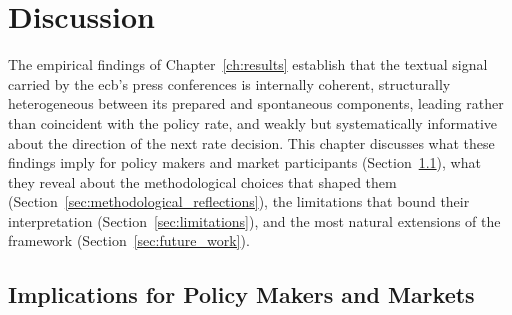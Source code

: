 %
%

\chapter{Discussion}\label{ch:discussion}

The empirical findings of Chapter~\ref{ch:results} establish that the textual signal carried by the \gls{ecb}'s press conferences is internally coherent, structurally heterogeneous between its prepared and spontaneous components, leading rather than coincident with the policy rate, and weakly but systematically informative about the direction of the next rate decision. This chapter discusses what these findings imply for policy makers and market participants (Section~\ref{sec:implications}), what they reveal about the methodological choices that shaped them (Section~\ref{sec:methodological_reflections}), the limitations that bound their interpretation (Section~\ref{sec:limitations}), and the most natural extensions of the framework (Section~\ref{sec:future_work}).

\section{Implications for Policy Makers and Markets}
\label{sec:implications}

